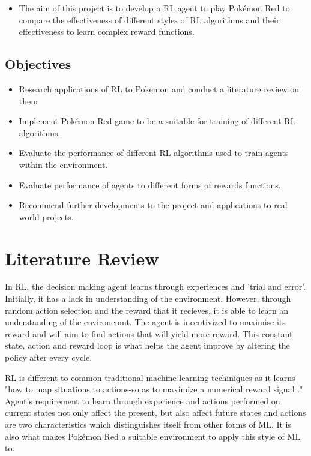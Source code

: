 \documentclass{surrey_disso_style}
\begin{document}
\begin{itemize}
   \item [\ding{54}] The aim of this project is to develop a RL agent to play Pokémon Red to compare the effectiveness of different styles of RL algorithms and their effectiveness to learn complex reward functions.
\end{itemize}

\subsection{Objectives}

\begin{itemize}
   \item [\ding{169}] Research applications of RL to Pokemon and conduct a literature review on them
   \item [\ding{169}] Implement Pokémon Red game to be a suitable for training of different RL algorithms.
   \item [\ding{169}] Evaluate the performance of different RL algorithms used to train agents within the environment.
   \item [\ding{169}] Evaluate performance of agents to different forms of rewards functions.
   \item [\ding{169}] Recommend further developments to the project and applications to real world projects.
\end{itemize}

\section{Literature Review}
In RL, the decision making agent learns through experiences and 'trial and error'. Initially, it has a lack in understanding of the environment. However, through random action selection and the reward that it recieves, it is able to learn an understanding of the environemnt. The agent is incentivized to maximise its reward and will aim to find actions that will yield more reward. This constant state, action and reward loop is what helps the agent improve by altering the policy after every cycle. 
\par

RL is different to common traditional machine learning techiniques as it learns "how to map situations to actions-so as to maximize a numerical reward signal \cite{Sutton1}." Agent's requirement to learn through experience and actions performed on current states not only affect the present, but also affect future states and actions are two characteristics which distinguishes itself from other forms of ML. It is also what makes Pokémon Red a suitable environment to apply this style of ML to. 
\par
\end{document}
